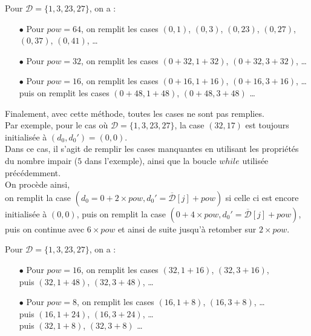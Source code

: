 \documentclass[12pt, a4paper]{memoir}
\newcommand{\dbarre}{\overline{\mathcal{D}}}
\begin{document}
      \begin{Exemple}
       Pour $\mathcal{D} = \{1,3,23,27\}$, on a : 
       \begin{itemize}
        \item [$\bullet$] Pour $pow = 64$, on remplit les cases $(0,1)$, $(0,3)$, $(0,23)$, $(0,27)$, $(0,37)$, $(0,41)$, \ldots
        \item [$\bullet$] Pour $pow = 32$, on remplit les cases $(0+32,1+32)$, $(0+32,3+32)$, \ldots
        \item [$\bullet$] Pour $pow = 16$, on remplit les cases $(0+16,1+16)$, $(0+16,3+16)$, \ldots
        puis on remplit les cases $(0+48,1+48)$, $(0+48,3+48)$ \ldots
       \end{itemize}
      \end{Exemple}

      Finalement, avec cette méthode, toutes les cases ne sont pas remplies. \\
      Par exemple, pour le cas où $\mathcal{D} = \{1,3,23,27\}$, la case $(32,17)$ est toujours initialisée à $(d_0,d_0') = (0,0)$. \\
      Dans ce cas, il s'agit de remplir les cases manquantes en utilisant les propriétés du nombre impair ($5$ dans l'exemple),
      ainsi que la boucle $while$ utilisée précédemment. \\
      On procède ainsi, \\
      on remplit la case $(d_0 = 0 + 2 \times pow, d_0' = \dbarre[j] + pow)$ si celle ci est encore initialisée à $(0,0)$,
      puis on remplit la case $(0 + 4 \times pow, d_0' = \dbarre[j] + pow)$, puis on continue avec $6 \times pow$ et ainsi de suite
      jusqu'à retomber sur $2 \times pow$.
      
      \begin{Exemple}
       Pour $\mathcal{D} = \{1,3,23,27\}$, on a : 
       \begin{itemize}
        \item [$\bullet$] Pour $pow = 16$, on remplit les cases $(32,1+16)$, $(32,3+16)$, \\
        puis $(32,1+48)$, $(32,3+48)$, \ldots
        \item [$\bullet$] Pour $pow = 8$, on remplit les cases $(16,1+8)$, $(16,3+8)$, \ldots \\
        puis $(16,1+24)$, $(16,3+24)$, \ldots \\
        puis $(32,1+8)$, $(32,3+8)$ \ldots
       \end{itemize}
      \end{Exemple}
      
\end{document}
